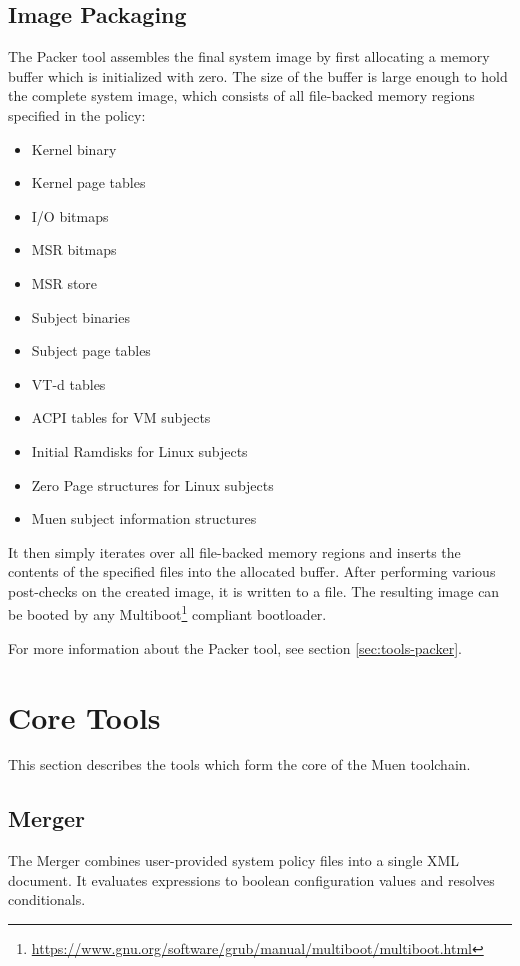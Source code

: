 \documentclass[a4paper,twoside,titlepage]{article}
\begin{document}
\subsection{Image Packaging}
The Packer tool assembles the final system image by first allocating a memory
buffer which is initialized with zero. The size of the buffer is large enough
to hold the complete system image, which consists of all file-backed memory
regions specified in the policy:

\begin{itemize}
	\item Kernel binary
	\item Kernel page tables
	\item I/O bitmaps
	\item MSR bitmaps
	\item MSR store
	\item Subject binaries
	\item Subject page tables
	\item VT-d tables
	\item ACPI tables for VM subjects
	\item Initial Ramdisks for Linux subjects
	\item Zero Page structures for Linux subjects
	\item Muen subject information structures
\end{itemize}

It then simply iterates over all file-backed memory regions and inserts the
contents of the specified files into the allocated buffer. After performing
various post-checks on the created image, it is written to a file. The
resulting image can be booted by any
Multiboot\footnote{\url{https://www.gnu.org/software/grub/manual/multiboot/multiboot.html}}
compliant bootloader.

For more information about the Packer tool, see section \ref{sec:tools-packer}.

\section{Core Tools}
\label{sec:tools}

This section describes the tools which form the core of the Muen toolchain.

\subsection{Merger}
\label{sec:tools-merger}
The Merger combines user-provided system policy files into a single XML
document. It evaluates expressions to boolean configuration values and resolves
conditionals.
\end{document}
